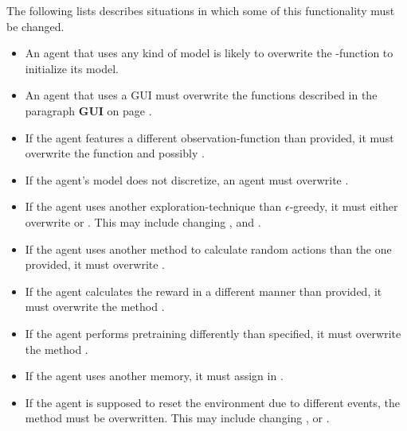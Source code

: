 The following lists describes situations in which some of this functionality must be changed.
\begin{itemize}[noitemsep]
	\item An agent that uses any kind of model is likely to overwrite the -function to initialize its model. 
	\item An agent that uses a GUI must overwrite the functions described in the paragraph \textbf{GUI} on page \pageref{paragraph:gui}.
	\item If the agent features a different observation-function than provided, it must overwrite the function  and possibly . 
	\item If the agent's model does not discretize, an agent must overwrite  .
	\item If the agent uses another exploration-technique than $\epsilon$-greedy, it must either overwrite  or . This may include changing ,  and .
	\item If the agent uses another method to calculate random actions than the one provided, it must overwrite .
	\item If the agent calculates the reward in a different manner than provided, it must overwrite the method .
	\item If the agent performs pretraining differently than specified, it must overwrite the method .
	\item If the agent uses another memory, it must assign  in .
	\item If the agent is supposed to reset the environment due to different events, the method  must be overwritten. This may include changing ,  or .
\end{itemize}







